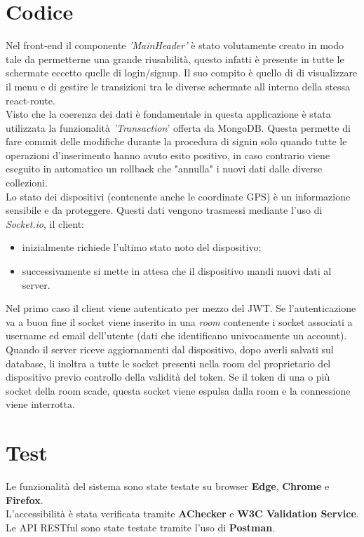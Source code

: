\documentclass{report}
\begin{document}
\section{Codice}
Nel front-end il componente \textit{'MainHeader'} è stato volutamente creato in modo tale da permetterne una grande riusabilità, questo infatti è presente in tutte le schermate eccetto quelle di login/signup. Il suo compito è quello di di visualizzare il menu e di gestire le transizioni tra le diverse schermate all interno della stessa react-route.\\
Visto che la coerenza dei dati è fondamentale in questa applicazione è stata utilizzata la funzionalità \textit{'Transaction}' offerta da MongoDB. Questa permette di fare commit delle modifiche durante la procedura di signin solo quando tutte le operazioni d'inserimento hanno avuto esito positivo, in caso contrario viene eseguito in automatico un rollback che "annulla" i nuovi dati dalle diverse collezioni.\\
Lo stato dei dispositivi (contenente anche le coordinate GPS) è un informazione sensibile e da proteggere. Questi dati vengono trasmessi mediante l'uso di \textit{Socket.io}, il client:
\begin{itemize}
    \item inizialmente richiede l'ultimo stato noto del dispositivo;
    \item successivamente si mette in attesa che il dispositivo mandi nuovi dati al server.
\end{itemize}
Nel primo caso il client viene autenticato per mezzo del JWT. Se l'autenticazione va a buon fine il socket viene inserito in una \textit{room} contenente i socket associati a username ed email dell'utente (dati che identificano univocamente un account).\\
Quando il server riceve aggiornamenti dal dispositivo, dopo averli salvati sul database, li inoltra a tutte le socket presenti nella room del proprietario del dispositivo previo controllo della validità del token. Se il token di una o più socket della room scade, questa socket viene espulsa dalla room e la connessione viene interrotta.


\section{Test}
Le funzionalità del sistema sono state testate su browser \textbf{Edge}, \textbf{Chrome} e \textbf{Firefox}.\\
L'accessibilità è stata verificata tramite \textbf{AChecker} e \textbf{W3C Validation Service}.\\
Le API RESTful sono state testate tramite l'uso di \textbf{Postman}.
\end{document}

